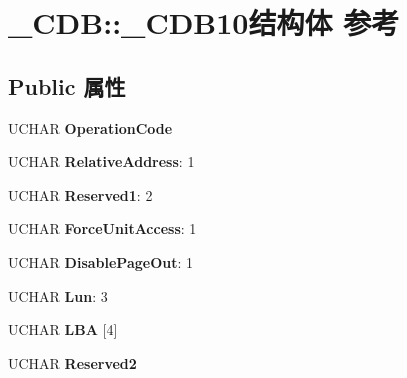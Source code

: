 \hypertarget{struct___c_d_b_1_1___c_d_b10}{}\section{\+\_\+\+C\+DB\+:\+:\+\_\+\+C\+D\+B10结构体 参考}
\label{struct___c_d_b_1_1___c_d_b10}
\subsection*{Public 属性}
\begin{DoxyCompactItemize}
\item 
\mbox{\label{struct___c_d_b_1_1___c_d_b10_a67c6be48e90f58be43286bbc1fa095ca}} 
U\+C\+H\+AR {\bfseries Operation\+Code}
\item 
\mbox{\label{struct___c_d_b_1_1___c_d_b10_aa51a1b0e531e7c63b0ba9a01e0c4e399}} 
U\+C\+H\+AR {\bfseries Relative\+Address}\+: 1
\item 
\mbox{\label{struct___c_d_b_1_1___c_d_b10_ac5ea096007ee03d7290d098c4a759ed5}} 
U\+C\+H\+AR {\bfseries Reserved1}\+: 2
\item 
\mbox{\label{struct___c_d_b_1_1___c_d_b10_aa58c00fe1d747057ec54b5ecaf708986}} 
U\+C\+H\+AR {\bfseries Force\+Unit\+Access}\+: 1
\item 
\mbox{\label{struct___c_d_b_1_1___c_d_b10_a7aad779a9e3b440cde3cf98e3816c6f1}} 
U\+C\+H\+AR {\bfseries Disable\+Page\+Out}\+: 1
\item 
\mbox{\label{struct___c_d_b_1_1___c_d_b10_ae034576608975e0f31d446bd3cd007b3}} 
U\+C\+H\+AR {\bfseries Lun}\+: 3
\item 
\mbox{\label{struct___c_d_b_1_1___c_d_b10_aa1b484e2bdb644978dd4ef28a6c25beb}} 
U\+C\+H\+AR {\bfseries L\+BA} \mbox{[}4\mbox{]}
\item 
\mbox{\label{struct___c_d_b_1_1___c_d_b10_a3ec3bdce00173b590072705b5d59efa7}} 
U\+C\+H\+AR {\bfseries Reserved2}
\item 

\end{DoxyCompactItemize}
